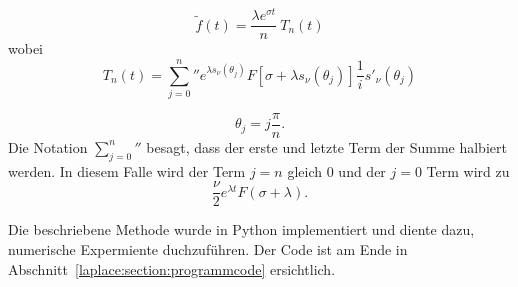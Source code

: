 \begin{equation}
\tilde{f}(t) = \frac{\lambda e^{\sigma t}}{n}~T_{n}(t)
\end{equation}
wobei 
\begin{equation}
T_{n}(t)
=
{\sum_{j=0}^n}'' e^{\lambda s_{\nu}(\theta_{j})}
F[\sigma + \lambda s_{\nu}(\theta_{j})]
\frac{1}{i} s'_{\nu}(\theta_{j})
\end{equation}

\begin{equation}
\theta_{j} = j \frac{\pi}{n}.
\end{equation}
Die Notation ${\sum_{j=0}^n}''$ besagt, dass der erste und letzte
Term der Summe halbiert werden.
In diesem Falle wird der Term $j=n$ gleich 0 und der $j=0$ Term wird zu
\begin{equation}
\frac{\nu}{2}e^{\lambda t}F(\sigma + \lambda).
\end{equation}


Die beschriebene Methode wurde in Python implementiert und diente dazu, numerische Expermiente duchzuführen.
Der Code ist am Ende in Abschnitt~\ref{laplace:section:programmcode} ersichtlich. 

